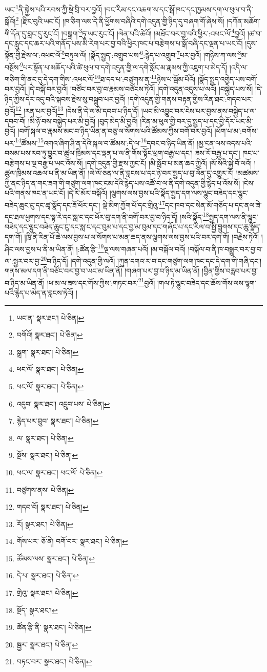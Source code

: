 ཡང་\footnote{ཡང་ན་  སྣར་ཐང་།  པེ་ཅིན། }ནི་སྐྱེས་པའི་རབས་ཀྱི་སྡེ་བྲི་བར་བྱའོ། །བང་རིམ་དང་འཆག་ས་དང་སྒོ་ཁང་དང་ཁྱམས་དག་ལ་ཕུལ་བ་ནི་སྒོའོ།\footnote{བགོའོ།  སྣར་ཐང་།  པེ་ཅིན། } །རྫིང་བུའི་ཡང་ངོ། །ཁ་ཅིག་ལས་དེ་ནི་ཕྱོགས་བཞིའི་དགེ་འདུན་གྱི་ཉིད་དུ་བཞག་གོ་ཞེས་སོ། །དཀོན་མཆོག་གི་དོན་དུ་བླང་དུ་རུང་ངོ། །བསྒྲག་\footnote{སྒྲག་  སྣར་ཐང་།  པེ་ཅིན། }ཏུ་ཡང་རུང་ངོ། །ལེན་པའི་ཚེའོ། །མཐོང་བར་བྱ་བའི་ཕྱིར་:འཕང་ལོ་\footnote{ཕང་ལོ་  སྣར་ཐང་།  པེ་ཅིན། }བྱའོ། །ཚ་བ་དང་རླུང་དང་ཆར་པའི་གནོད་པས་མི་རེག་པར་བྱ་བའི་ཕྱིར་ཁང་པ་བརྩེགས་པ་སྒོ་བཞི་དང་ལྡན་པ་ཡང་ངོ། །དུས་སྟོན་གྱི་རྗེས་ལ་:འཕང་ལོ་\footnote{ཕང་ལོ་  སྣར་ཐང་།  པེ་ཅིན། }བཏུལ་ལོ། །སྣོད་སྤྱད་:འགྲུབ་པས་\footnote{འདུབ་  སྣར་ཐང་། འདྲུབ་པས་  པེ་ཅིན། }:རྙེད་པ་འགྲུབ་\footnote{རྙེད་པར་བྲུབ་  སྣར་ཐང་།  པེ་ཅིན། }པར་བྱའོ། །གཉིས་ཀ་ལས་\footnote{ལ་  སྣར་ཐང་།  པེ་ཅིན། }མ་བསྔོས་\footnote{སྔོས་  སྣར་ཐང་།  པེ་ཅིན། }པར་སྟོན་པ་མཆོད་པའི་ཚེ་ཕུལ་བ་དགེ་འདུན་གྱི་ལ་དགེ་སློང་མ་རྣམས་ཀྱི་འཇུག་པ་མེད་དོ། །འདི་ལ་གཅིག་གི་ནང་དུ་དེ་དག་གིས་:འཕང་ལོ་\footnote{ཕང་ལ་  སྣར་ཐང་། ཕང་ལོ་  པེ་ཅིན། }ཐ་དད་པ་:བཙུགས་ན་\footnote{བཙུགས་ནས་  པེ་ཅིན། }ཉེས་པ་སྦོམ་པོའོ། །སྣོད་སྤྱད་འགྱེད་པས་བགོ་བར་བྱའོ། །དེ་བསྐོ་བར་བྱའོ། །བཙོང་བར་བྱ་བ་རྣམས་བཙོངས་ཏེའོ། །དགེ་འདུན་འདུས་པ་ལའོ། །བསྐྱེད་པས་སོ། །དེ་ཉིད་ཀྱིས་དེར་འདུ་བའི་སྐབས་རྗེས་སུ་བསྒྲུབ་པར་བྱའོ། །དགེ་འདུན་གྱི་གནས་བརྟན་གྱིས་རིན་ཐང་:གདབ་པར་བྱའོ།\footnote{གདབ་བོ།  སྣར་ཐང་།  པེ་ཅིན། } །རན་པར་བྱའོ།\footnote{རོ།  སྣར་ཐང་།  པེ་ཅིན། } །དེས་ནི་དེ་ལ་མི་དབབ་པ་ཉིད་དོ། །ཡང་མི་འབྱུང་བར་ངེས་པར་བྱས་ནས་བསྐྱེད་པ་ལ་དབབ་བོ། །མི་ཉོ་བས་བསྐྱེད་པར་མི་བྱའོ། །བུད་མེད་མི་བྱའོ། །རིན་མ་ཕུལ་གྱི་བར་དུ་སྤྱད་པ་དང་བྱི་དོར་ཡང་མི་བྱའོ། །བགོ་སྐལ་བ་རྣམས་མང་བ་ཉིད་ཡིན་ན་བཅུ་ལ་སོགས་པའི་ཚོམས་ཀྱིས་བགོ་བར་བྱའོ། །ཕོག་པ་མ་:བགོས་པར་\footnote{གོས་པར་  ཅོ་ནེ། བགོ་བར་  སྣར་ཐང་།  པེ་ཅིན། }ཚོམས་\footnote{ཚོམས་ལས་  སྣར་ཐང་།  པེ་ཅིན། }འགའ་ཞིག་ཤི་ན་དེའི་སྐལ་བ་ཚོམས་:དེ་ལ་\footnote{དེ་པ་  སྣར་ཐང་།  པེ་ཅིན། }དབང་བ་ཉིད་ཡིན་ནོ། །མྱ་ངན་ལས་འདས་པའི་བསམ་པས་རབ་ཏུ་བྱུང་བ་ཚུལ་ཁྲིམས་དང་ལྡན་པ་ལ་ནི་གོས་སྟོང་ཕྲག་བརྒྱ་པ་དང་། ཟས་རོ་བརྒྱ་པ་དང་། ཁང་པ་བརྩེགས་པ་ལྔ་བརྒྱ་པ་ཡང་འོས་སོ། །དགེ་འདུན་གྱི་རྫས་ཀྱང་ངོ། །མི་སློབ་པ་མན་ཆད་ཀྱིའོ། །སོ་སོའི་སྐྱེ་བོ་ལའོ། །ཚུལ་ཁྲིམས་འཆལ་པ་ནི་མ་ཡིན་ནོ། །ལེ་ལོ་ཅན་ལ་ནི་བླངས་པ་དང་ཉེ་བར་སྤྱད་པ་བུ་ལོན་དུ་འགྱུར་རོ། །མཚམས་ཀྱི་ནང་ཉིད་ན་གང་ཟག་གི་གཙུག་ལག་ཁང་ངམ་དེའི་རྙེད་པས་འཚོ་བ་ལ་ནི་དགེ་འདུན་གྱི་རྙེད་པ་འོས་སོ། །ངེས་པའི་གནས་ཁང་ན་ཡང་ངོ། །དེ་རི་མོར་བསྐོའོ། །ལྕགས་ལས་བྱས་པའི་སྣོད་སྤྱད་དག་ལས་ལྷུང་བཟེད་དང་ལྷུང་བཟེད་ཆུང་ངུ་དང་ཚྭ་སྣོད་དང་ཟོ་ཕོར་དང་། ལྡེ་མིག་ཀྱོག་པོ་དང་གྲིའུ་\footnote{གྲེའུ་  སྣར་ཐང་།  པེ་ཅིན། }དང་ཁབ་དང་སེན་མོ་གཅོད་པ་དང་ནལ་ཟེ་དང་ཐལ་ཕྱགས་དང་སྟ་རེ་དང་སླ་ང་དང་ཕོར་བུ་དག་ནི་བགོ་བར་བྱ་བ་ཉིད་དོ། །སའི་སྣོད་\footnote{སྔོད་  སྣར་ཐང་། }སྤྱད་དག་ལས་ནི་ལྷུང་བཟེད་དང་ལྷུང་བཟེད་ཆུང་ངུ་དང་སླ་ང་དང་བུམ་པ་དང་བྱ་མ་བུམ་དང་གཞོང་པ་དང་རིལ་བ་སྤྱི་བླུགས་དང་ཆུ་སྣོད་དག་གོ། །ཁྲི་ནི་རིན་པོ་ཆེ་ལས་བྱས་པ་ལ་སོགས་པ་མན་ཆད་ནས་ལྕགས་ལས་བྱས་པའི་བར་དག་གོ། །བརྗེས་ཏེའོ། །ཤིང་ལས་བྱས་པ་ནི་མ་ཡིན་ནོ། །:ཚོན་རྩི་\footnote{ཚོན་རྩི་ནི་  སྣར་ཐང་།  པེ་ཅིན། }ལྔ་ལས་གཞན་པའོ། །མ་བསྐོལ་བའོ། །བསྐོལ་བ་ནི་ཁ་བསྒྱུར་བར་བྱ་བ་ལ་:སྦྱར་བར་བྱ་\footnote{སྦྱར་  སྣར་ཐང་།  པེ་ཅིན། }བ་ཉིད་དོ། །དགེ་འདུན་གྱི་ལའོ། །ཀུན་དགའ་ར་བ་དང་གཙུག་ལག་ཁང་དང་དེ་དག་གི་གཞི་དང་། གནས་མལ་དག་ནི་བཙོང་བར་བྱ་བ་ཡང་མ་ཡིན་ནོ། །གཞག་པར་བྱ་བ་ཉིད་མ་ཡིན་ནོ། །བྱིན་གྱིས་བརླབ་པར་བྱ་བ་ཉིད་མ་ཡིན་ནོ། །ཕ་མ་ལ་ཟས་དང་གོས་ཀྱིས་:གཏང་བར་\footnote{བཏང་བར་  སྣར་ཐང་།  པེ་ཅིན། }བྱའོ། །གལ་ཏེ་ལྷུང་བཟེད་དང་ཆོས་གོས་ལས་ལྷག་པའི་རྙེད་པ་མེད་ན་བླངས་ཏེའོ། །
